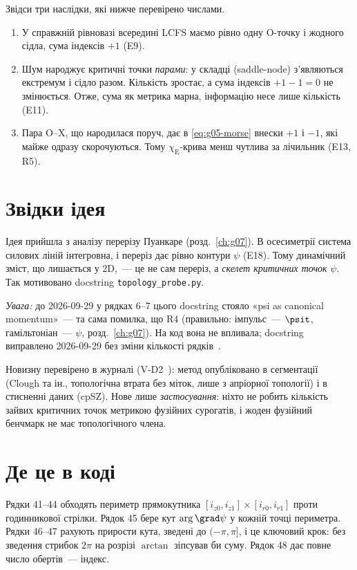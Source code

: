 Звідси три наслідки, які нижче перевірено числами.
\begin{enumerate}
\item У справжній рівновазі всередині LCFS маємо рівно одну O-точку і жодного сідла, сума індексів $+1$ (E9).
\item Шум народжує критичні точки \emph{парами}: у складці (saddle-node) з'являються екстремум і сідло разом. Кількість зростає, а сума індексів $+1-1=0$ не змінюється. Отже, сума як метрика марна, інформацію несе лише кількість (E11).
\item Пара O--X, що народилася поруч, дає в \eqref{eq:g05-morse} внески $+1$ і $-1$, які майже одразу скорочуються. Тому $\chi_{\mathrm E}$-крива менш чутлива за лічильник (E13, R5).
\end{enumerate}

\section{Звідки ідея}\label{sec:g05-origin}

Ідея прийшла з аналізу перерізу Пуанкаре (розд.~\ref{ch:g07}). В осесиметрії система силових ліній інтегровна, і переріз дає рівно контури $\psi$ (E18). Тому динамічний зміст, що лишається у 2D,~--- це не сам переріз, а \emph{скелет критичних точок} $\psi$. Так мотивовано docstring \texttt{topology\_probe.py}.

\emph{Увага:} до 2026-09-29 у рядках 6--7 цього docstring стояло «psi as canonical momentum»~--- та сама помилка, що R4 (правильно: імпульс~--- $\psit$, гамільтоніан~--- $\psi$, розд.~\ref{ch:g07}). На код вона не впливала; docstring виправлено 2026-09-29 без зміни кількості рядків~\cite{RegLog}.

Новизну перевірено в журналі (V-D2~\cite{RegVerif}): метод опубліковано в сегментації (Clough та ін., топологічна втрата без міток, лише з апріорної топології) і в стисненні даних (cpSZ). Нове лише \emph{застосування}: ніхто не робить кількість зайвих критичних точок метрикою фузійних сурогатів, і жоден фузійний бенчмарк не має топологічного члена.

\section{Де це в коді}\label{sec:g05-code}


Рядки 41--44 обходять периметр прямокутника $[i_{z0},i_{z1}]\times[i_{r0},i_{r1}]$ проти годинникової стрілки. Рядок 45 бере кут $\arg\grad\psi$ у кожній точці периметра. Рядки 46--47 рахують прирости кута, зведені до $(-\pi,\pi]$, і це ключовий крок: без зведення стрибок $2\pi$ на розрізі $\arctan$ зіпсував би суму. Рядок 48 дає повне число обертів~--- індекс.

